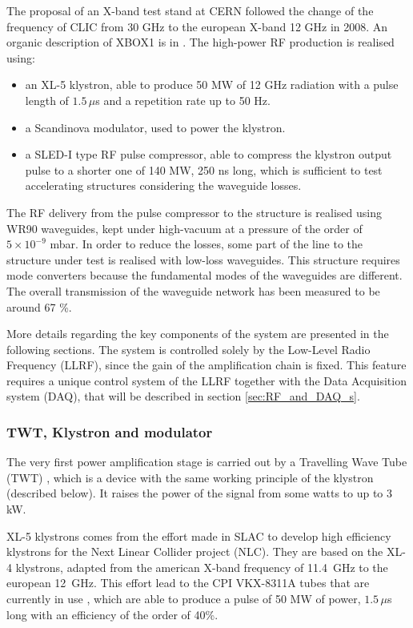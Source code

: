 The proposal of an X-band test stand at CERN followed the change of the frequency of CLIC from 30 GHz to the european X-band 12 GHz in 2008. An organic description of XBOX1 is in \cite{Woolley:2015,Kovermann:1459879}. The high-power RF production is realised using:
\begin{itemize}
\item an XL-5 klystron, able to produce 50 MW of 12 GHz radiation with a pulse length of $1.5\, \mu$s and a repetition rate up to 50 Hz.
\item a Scandinova modulator, used to power the klystron.
\item a SLED-I type RF pulse compressor, able to compress the klystron output pulse to a shorter one of 140 MW, 250 ns long, which is sufficient to test accelerating structures considering the waveguide losses.
\end{itemize}

The RF delivery from the pulse compressor to the structure is realised using WR90 waveguides, kept under high-vacuum at a pressure of the order of\\ $5\times10^{-9}$ mbar. In order to reduce the losses, some part of the line to the structure under test is realised with low-loss waveguides. This structure requires mode converters because the fundamental modes of the waveguides are different. The overall transmission of the waveguide network has been measured to be around 67 \%.

More details regarding the key components of the system are presented in the following sections. The system is controlled solely by the Low-Level Radio Frequency (LLRF), since the gain of the amplification chain is fixed. This feature requires a unique control system of the LLRF together with the Data Acquisition system (DAQ), that will be described in section \ref{sec:RF_and_DAQ_s}.


\subsubsection{TWT, Klystron and modulator}

The very first power amplification stage is carried out by a Travelling Wave Tube (TWT) \cite{appSys:twt}, which is a device with the same working principle of the klystron (described below). It raises the power of the signal from some watts to up to 3 kW.

XL-5 klystrons comes from the effort made in SLAC to develop high efficiency klystrons for the Next Linear Collider project (NLC). They are based on the XL-4 klystrons, adapted from the american X-band frequency of 11.4~GHz to the european 12~GHz. This effort lead to the CPI VKX-8311A tubes that are currently in use \cite{klystron:CPI}, which are able to produce a pulse of 50 MW of power, $1.5 \, \mu$s long with an efficiency of the order of 40\%.
 
